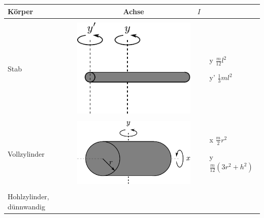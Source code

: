 \newpage
\begin{table}[h!]
\centering
\begin{tabular}{m{2cm} c m{}}
Körper	& Achse	& $I$ \\
\hline
& & \\
Stab &
	\begin{minipage}{0.3\textwidth}
	\centering
	\includegraphics[scale=\traegscale]{traeg-stab.pdf}
	\end{minipage} &
		\begin{itemize}
		\item[y] $\frac{m}{12} l^2$
		\item[y'] $\frac{1}{3} m l^2$
		\end{itemize} \\
& & \\
Vollzylinder &
	\begin{minipage}{0.3\textwidth}
	\centering
	\includegraphics[scale=\traegscale]{traeg-vollzylinder.pdf}
	\end{minipage} &
		\begin{itemize}
		\item[x] $\frac{m}{2} r^2$
		\item[y] $\frac{m}{12} \left( 3r^2 + h^2 \right)$
		\end{itemize} \\
& & \\
Hohlzylinder, dünnwandig &
	\begin{minipage}{0.3\textwidth}

\end{minipage}
\end{tabular}
\end{table}
